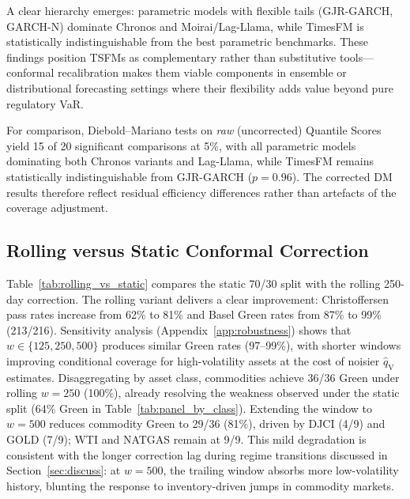 \documentclass[preprint,11pt,authoryear]{elsarticle}
\newcommand{\1}{\boldsymbol{1}}
\newcommand{\qV}{\hat{q}_{\scriptscriptstyle\mathrm{V}}}
\begin{document}
	A clear hierarchy emerges: parametric models with flexible
	tails (GJR-GARCH, GARCH-N) dominate Chronos and
	Moirai/Lag-Llama, while TimesFM is statistically
	indistinguishable from the best parametric benchmarks. These
	findings position TSFMs as complementary rather than
	substitutive tools---conformal recalibration makes them viable
	components in ensemble or distributional forecasting settings
	where their flexibility adds value beyond pure regulatory VaR.
	
	For comparison, Diebold--Mariano tests on \emph{raw}
	(uncorrected) Quantile Scores yield 15 of 20 significant
	comparisons at 5\%, with all parametric models dominating
	both Chronos variants and Lag-Llama, while TimesFM remains
	statistically indistinguishable from GJR-GARCH ($p = 0.96$).
	The corrected DM results therefore reflect residual efficiency
	differences rather than artefacts of the coverage adjustment.
	
	\subsection{Rolling versus Static Conformal Correction}
	\label{sec:rolling_results}
	
	Table~\ref{tab:rolling_vs_static} compares the static 70/30
	split with the rolling 250-day correction. The rolling variant
	delivers a clear improvement: Christoffersen pass rates
	increase from 62\% to 81\% and Basel Green rates from 87\%
	to 99\% (213/216). Sensitivity analysis
	(Appendix~\ref{app:robustness}) shows that
	$w \in \{125, 250, 500\}$ produces similar Green rates
	(97--99\%), with shorter windows improving conditional
	coverage for high-volatility assets at the cost of noisier
	$\qV$ estimates.
	Disaggregating by asset class, commodities achieve 36/36 Green under rolling $w=250$ (100\%), already resolving the weakness observed under the static split (64\% Green in Table~\ref{tab:panel_by_class}). Extending the window to $w=500$ reduces commodity Green to 29/36 (81\%), driven by DJCI (4/9) and GOLD (7/9); WTI and NATGAS remain at 9/9. This mild degradation is consistent with the longer correction lag during regime transitions discussed in Section~\ref{sec:discuss}: at $w=500$, the trailing window absorbs more low-volatility history, blunting the response to inventory-driven jumps in commodity markets.
	
\end{document}
